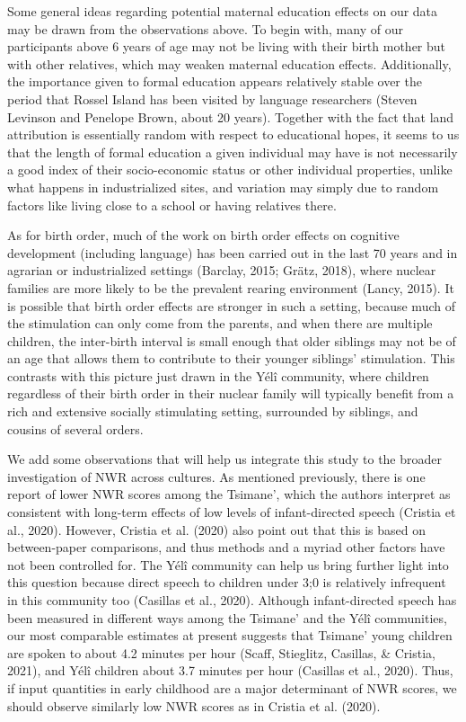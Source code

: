 \documentclass[english,,man,floatsintext]{apa6}
\begin{document}
Some general ideas regarding potential maternal education effects on our data may be drawn from the observations above. To begin with, many of our participants above 6 years of age may not be living with their birth mother but with other relatives, which may weaken maternal education effects. Additionally, the importance given to formal education appears relatively stable over the period that Rossel Island has been visited by language researchers (Steven Levinson and Penelope Brown, about 20 years). Together with the fact that land attribution is essentially random with respect to educational hopes, it seems to us that the length of formal education a given individual may have is not necessarily a good index of their socio-economic status or other individual properties, unlike what happens in industrialized sites, and variation may simply due to random factors like living close to a school or having relatives there.

As for birth order, much of the work on birth order effects on cognitive development (including language) has been carried out in the last 70 years and in agrarian or industrialized settings (Barclay, 2015; Grätz, 2018), where nuclear families are more likely to be the prevalent rearing environment (Lancy, 2015). It is possible that birth order effects are stronger in such a setting, because much of the stimulation can only come from the parents, and when there are multiple children, the inter-birth interval is small enough that older siblings may not be of an age that allows them to contribute to their younger siblings' stimulation. This contrasts with this picture just drawn in the Yélî community, where children regardless of their birth order in their nuclear family will typically benefit from a rich and extensive socially stimulating setting, surrounded by siblings, and cousins of several orders.

We add some observations that will help us integrate this study to the broader investigation of NWR across cultures. As mentioned previously, there is one report of lower NWR scores among the Tsimane', which the authors interpret as consistent with long-term effects of low levels of infant-directed speech (Cristia et al., 2020). However, Cristia et al. (2020) also point out that this is based on between-paper comparisons, and thus methods and a myriad other factors have not been controlled for. The Yélî community can help us bring further light into this question because direct speech to children under 3;0 is relatively infrequent in this community too (Casillas et al., 2020). Although infant-directed speech has been measured in different ways among the Tsimane' and the Yélî communities, our most comparable estimates at present suggests that Tsimane' young children are spoken to about 4.2 minutes per hour (Scaff, Stieglitz, Casillas, \& Cristia, 2021), and Yélî children about 3.7 minutes per hour (Casillas et al., 2020). Thus, if input quantities in early childhood are a major determinant of NWR scores, we should observe similarly low NWR scores as in Cristia et al. (2020).
\end{document}
